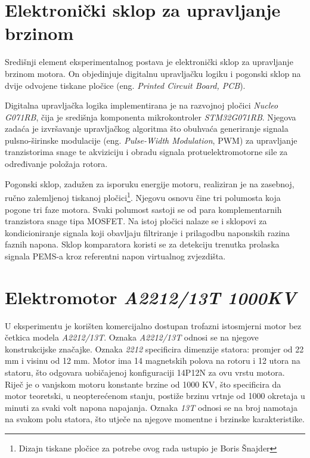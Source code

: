 \documentclass[diplomskirad]{fer}
\begin{document}
\section{Elektronički sklop za upravljanje brzinom}
\label{sec:esc}

Središnji element eksperimentalnog postava je elektronički sklop za upravljanje
brzinom motora. On objedinjuje digitalnu upravljačku logiku i pogonski sklop na
dvije odvojene tiskane pločice (eng. \textit{Printed Circuit Board, PCB}).

Digitalna upravljačka logika implementirana je na razvojnoj pločici
\textit{Nucleo G071RB}, čija je središnja komponenta mikrokontroler
\textit{STM32G071RB}. Njegova zadaća je izvršavanje upravljačkog algoritma što
obuhvaća generiranje signala pulsno-širinske modulacije (eng.
\textit{Pulse-Width Modulation}, PWM) za upravljanje tranzistorima snage te
akviziciju i obradu signala protuelektromotorne sile za određivanje položaja
rotora.

Pogonski sklop, zadužen za isporuku energije motoru, realiziran je na zasebnoj,
ručno zalemljenoj tiskanoj pločici\footnote{Dizajn tiskane pločice za potrebe
	ovog rada ustupio je Boris Šnajder}. Njegovu osnovu čine tri polumosta koja
pogone tri faze motora. Svaki polumost sastoji se od para komplementarnih
tranzistora snage tipa MOSFET. Na istoj pločici nalaze se i sklopovi za
kondicioniranje signala koji obavljaju filtriranje i prilagodbu naponskih
razina faznih napona. Sklop komparatora koristi se za detekciju trenutka
prolaska signala PEMS-a kroz referentni napon virtualnog zvjezdišta.

\section{Elektromotor \textit{A2212/13T  1000KV}}
\label{sec:motor}

U eksperimentu je korišten komercijalno dostupan trofazni istosmjerni motor bez
četkica modela \textit{A2212/13T}. Oznaka \textit{A2212/13T} odnosi se na
njegove konstrukcijske značajke. Oznaka \textit{2212} specificira dimenzije
statora: promjer od 22 mm i visinu od 12 mm. Motor ima 14 magnetskih polova na
rotoru i 12 utora na statoru, što odgovara uobičajenoj konfiguraciji 14P12N za
ovu vrstu motora. Riječ je o vanjskom motoru konstante brzine od 1000 KV, što
specificira da motor teoretski, u neopterećenom stanju, postiže brzinu vrtnje
od 1000 okretaja u minuti za svaki volt napona napajanja. Oznaka \textit{13T}
odnosi se na broj namotaja na svakom polu statora, što utječe na njegove
momentne i brzinske karakteristike. 
\end{document}

